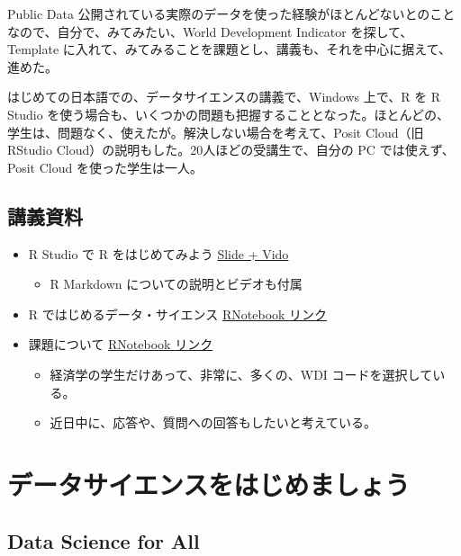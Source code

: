 \documentclass[
]{book}
\providecommand{\tightlist}{%
  \setlength{\itemsep}{0pt}\setlength{\parskip}{0pt}}
\theoremstyle{definition}
\theoremstyle{definition}
\theoremstyle{definition}
\theoremstyle{definition}
\theoremstyle{remark}
\begin{document}
Public Data 公開されている実際のデータを使った経験がほとんどないとのことなので、自分で、みてみたい、World Development Indicator を探して、Template に入れて、みてみることを課題とし、講義も、それを中心に据えて、進めた。

はじめての日本語での、データサイエンスの講義で、Windows 上で、R を R Studio を使う場合も、いくつかの問題も把握することとなった。ほとんどの、学生は、問題なく、使えたが。解決しない場合を考えて、Posit Cloud（旧 RStudio Cloud）の説明もした。20人ほどの受講生で、自分の PC では使えず、Posit Cloud を使った学生は一人。

\hypertarget{ux8b1bux7fa9ux8cc7ux6599-1}{%
\section{講義資料}\label{ux8b1bux7fa9ux8cc7ux6599-1}}

\begin{itemize}
\item
  R Studio で R をはじめてみよう \href{https://ds-sl.github.io/intro2r/getstarted.html}{Slide + Vido}

  \begin{itemize}
  \tightlist
  \item
    R Markdown についての説明とビデオも付属
  \end{itemize}
\item
  R ではじめるデータ・サイエンス \href{https://ds-sl.github.io/intro2r/eco232.nb.html}{RNotebook リンク}
\item
  課題について \href{https://ds-sl.github.io/intro2r/resp_assignment.nb.html}{RNotebook リンク}

  \begin{itemize}
  \tightlist
  \item
    経済学の学生だけあって、非常に、多くの、WDI コードを選択している。
  \item
    近日中に、応答や、質問への回答もしたいと考えている。
  \end{itemize}
\end{itemize}

\hypertarget{ds4aj}{%
\chapter{データサイエンスをはじめましょう}\label{ds4aj}}

\hypertarget{data-science-for-all}{%
\section*{Data Science for All}\label{data-science-for-all}}
\end{document}
